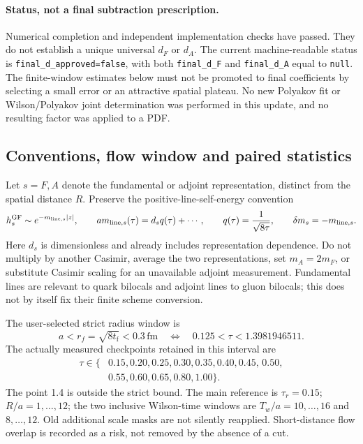 \documentclass[11pt]{article}
\numberwithin{equation}{section}
\newcommand{\tf}{t_{\mathrm f}}
\begin{document}
\paragraph{Status, not a final subtraction prescription.}
Numerical completion and independent implementation checks have passed.
They do not establish a unique universal \(d_F\) or \(d_A\). The current
machine-readable status is \texttt{final\_d\_approved=false}, with both
\texttt{final\_d\_F} and \texttt{final\_d\_A} equal to \texttt{null}.
The finite-window estimates below must not be promoted to final coefficients
by selecting a small error or an attractive spatial plateau. No new
Polyakov fit or Wilson/Polyakov joint determination was performed in this
update, and no resulting factor was applied to a PDF.

\subsection{Conventions, flow window and paired statistics}

Let \(s=F,A\) denote the fundamental or adjoint representation, distinct
from the spatial distance \(R\). Preserve the positive-line-self-energy
convention
\begin{equation}
 h_s^{\rm GF}\sim e^{-m_{{\rm line},s}|z|},\qquad
 am_{{\rm line},s}(\tau)=d_s q(\tau)+\cdots,\qquad
 q(\tau)=\frac{1}{\sqrt{8\tau}},\qquad
 \delta m_s=-m_{{\rm line},s}.
 \label{eq:line-mass-oct20-convention}
\end{equation}
Here \(d_s\) is dimensionless and already includes representation
dependence. Do not multiply by another Casimir, average the two
representations, set \(m_A=2m_F\), or substitute Casimir scaling for an
unavailable adjoint measurement. Fundamental lines are relevant to quark
bilocals and adjoint lines to gluon bilocals; this does not by itself fix
their finite scheme conversion.

The user-selected strict radius window is
\begin{equation}
 a<r_f=\sqrt{8\tf}<0.3\,\mathrm{fm}
 \quad\Longleftrightarrow\quad
 0.125<\tau<1.3981946511.
 \label{eq:line-mass-oct20-radius}
\end{equation}
The actually measured checkpoints retained in this interval are
\begin{equation}
 \begin{split}
 \tau\in\{&0.15,0.20,0.25,0.30,0.35,0.40,0.45,\,0.50,\\
           &0.55,0.60,0.65,0.80,1.00\}.
 \end{split}
\end{equation}
The point 1.4 is outside the strict bound. The main reference is
\(\tau_r=0.15\); \(R/a=1,\ldots,12\); the two inclusive Wilson-time
windows are \(T_w/a=10,\ldots,16\) and \(8,\ldots,12\). Old additional
scale masks are not silently reapplied. Short-distance flow overlap is
recorded as a risk, not removed by the absence of a cut.
\end{document}
